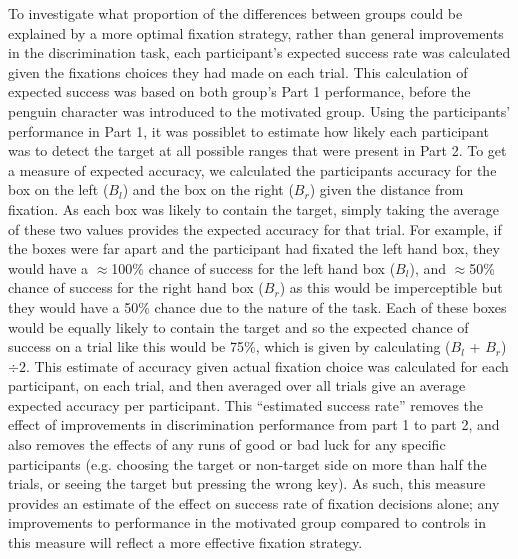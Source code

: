 \documentclass[vision,article,submit,moreauthors,pdftex,10pt,a4paper]{mdpi}
\begin{document}
To investigate what proportion of the differences between groups could be explained by a more optimal fixation strategy, rather than general improvements in the discrimination task, each participant’s expected success rate was calculated given the fixations choices they had made on each trial. This calculation of expected success was based on both group’s Part 1 performance, before the penguin character was introduced to the motivated group. Using the participants' performance in Part 1, it was possiblet to estimate how likely each participant was to detect the target at all possible ranges that were present in Part 2. To get a measure of expected accuracy, we calculated the participants accuracy for the box on the left ($B_{l}$) and the box on the right ($B_{r}$) given the distance from fixation. As each box was likely to contain the target, simply taking the average of these two values provides the expected accuracy for that trial. For example, if the boxes were far apart and the participant had fixated the left hand box, they would have a $\approx$100\% chance of success for the left hand box ($B_{l}$), and $\approx$50\% chance of success for the right hand box ($B_{r}$) as this would be imperceptible but they would have a 50\% chance due to the nature of the task. Each of these boxes would be equally likely to contain the target and so the expected chance of success on a trial like this would be 75\%, which is given by calculating ($B_{l}$ + $B_{r}$)$\div 2$. This estimate of accuracy given actual fixation choice was calculated for each participant, on each trial, and then averaged over all trials give an average expected accuracy per participant. This “estimated success rate” removes the effect of improvements in discrimination performance from part 1 to part 2, and also removes the effects of any runs of good or bad luck for any specific participants (e.g. choosing the target or non-target side on more than half the trials, or seeing the target but pressing the wrong key). As such, this measure provides an estimate of the effect on success rate of fixation decisions alone; any improvements to performance in the motivated group compared to controls in this measure will reflect a more effective fixation strategy.   
\end{document}
